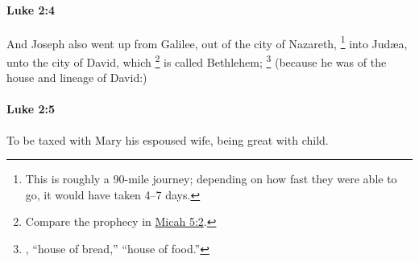 		\paragraph{Luke 2:4} %
			\label{LUKE-2-4}

			And Joseph also went up from Galilee, out of the city of Nazareth,%
				\footnote{%
					This is roughly a 90-mile journey; depending on how fast they were able to go, it would have taken 4--7 days.
					}
			into Judæa, unto the city of David, which%
				\footnote{%
					Compare the prophecy in \hyperref[MICAH-5-2]{Micah 5:2}.
					}
			is called Bethlehem;%
				\footnote{%
					, ``house of bread,'' ``house of food.'' 
					}
			(because he was of the house and lineage of David:)

			\begin{framed}
			\scriptsize
				\begin{compactdesc}
					\item[SBLG] 
				\end{compactdesc}
			\end{framed}

		\paragraph{Luke 2:5} %
			\label{LUKE-2-5}

			To be taxed with Mary his espoused wife, being great with child.

